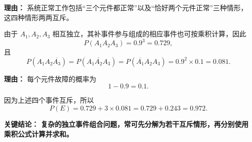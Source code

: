 \begin{examplebox}
\begin{description}[style=nextline, leftmargin=2.8em, labelsep=0.5em, itemsep=0.45em]
    \par\textbf{理由：}
    系统正常工作包括“三个元件都正常”以及“恰好两个元件正常”三种情形，这四种情形两两互斥。

    \item[\textbf{第二步（计算各情形的概率）：}]
    由于 $A_1,A_2,A_3$ 相互独立，其补事件参与组成的相应事件也可按乘积计算，因此
    \[
        P(A_1A_2A_3)
        =
        0.9^3
        =
        0.729,
    \]
    且
    \[
        P(A_1A_2\overline{A_3})
        =
        P(A_1\overline{A_2}A_3)
        =
        P(\overline{A_1}A_2A_3)
        =
        0.9^2\times 0.1
        =
        0.081.
    \]

    \par\textbf{理由：}
    每个元件故障的概率为
    \[
        1-0.9=0.1.
    \]

    \item[\textbf{第三步（求和）：}]
    因为上述四个事件互斥，所以
    \[
        P(E)
        =
        0.729+3\times 0.081
        =
        0.729+0.243
        =
        0.972.
    \]

\end{description}

\textbf{\textcolor{CExample}{关键结论：}}
\textbf{复杂的独立事件组合问题，常可先分解为若干互斥情形，再分别使用乘积公式计算并求和。}

\end{examplebox}
